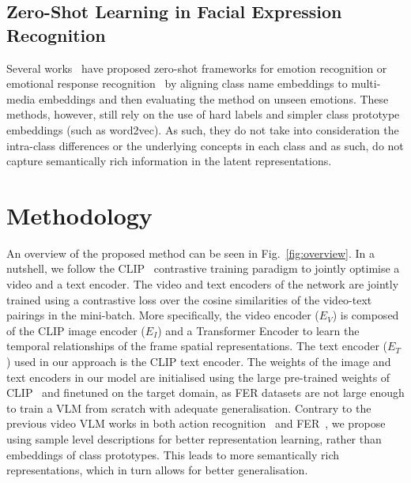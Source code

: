 \documentclass[10pt,twocolumn,letterpaper]{article}
\begin{document}
\subsection{Zero-Shot Learning in Facial Expression Recognition}

Several works~\cite{banerjee_learning_2022, qi_zero-shot_2021, xu_exploring_2022, xu2023zero} have proposed zero-shot frameworks for emotion recognition or emotional response recognition~\cite{zhan_zero-shot_2019} by aligning class name embeddings to multi-media embeddings and then evaluating the method on unseen emotions. These methods, however, still rely on the use of hard labels and simpler class prototype embeddings (such as word2vec). As such, they do not take into consideration the intra-class differences or the underlying concepts in each class and as such, do not capture semantically rich information in the latent representations.



\section{Methodology}
\label{sec:method}



An overview of the proposed method can be seen in Fig.~\ref{fig:overview}. In a nutshell, we follow the  CLIP~\cite{radford_CLIP_2021}  contrastive training paradigm to jointly optimise a video and a text encoder. The video and text encoders of the network are jointly trained using a contrastive loss over the cosine similarities of the video-text pairings in the mini-batch. 
More specifically, the video encoder ($E_V$) is composed of the CLIP image encoder ($E_I$) and a Transformer Encoder to learn the temporal relationships of the frame spatial representations. The text encoder ($E_T$) used in our approach is the CLIP text encoder. The weights of the image and text encoders in our model are initialised using the large pre-trained weights of CLIP~\cite{radford_CLIP_2021} and finetuned on the target domain, as FER datasets are not large enough to train a VLM from scratch with adequate generalisation. Contrary to the previous video VLM works in both action recognition~\cite{wang_actionclip_2021, lin_frozen_2022} and FER~\cite{li_cliper_2023, li_fer-former_2023}, we propose using sample level descriptions for better representation learning, rather than embeddings of class prototypes. This leads to more semantically rich representations, which in turn allows for better generalisation. 
\end{document}
